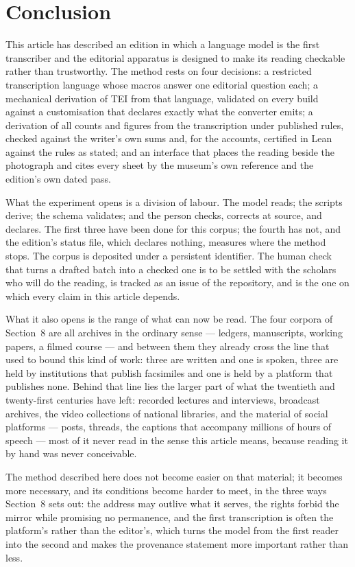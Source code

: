 \documentclass[11pt]{article}
\begin{document}
\section{Conclusion}

This article has described an edition in which a language model is the first transcriber and the editorial apparatus is designed to make its reading checkable rather than trustworthy. The method rests on four decisions: a restricted transcription language whose macros answer one editorial question each; a mechanical derivation of TEI from that language, validated on every build against a customisation that declares exactly what the converter emits; a derivation of all counts and figures from the transcription under published rules, checked against the writer's own sums and, for the accounts, certified in Lean against the rules as stated; and an interface that places the reading beside the photograph and cites every sheet by the museum's own reference and the edition's own dated pass.

What the experiment opens is a division of labour. The model reads; the scripts derive; the schema validates; and the person checks, corrects at source, and declares. The first three have been done for this corpus; the fourth has not, and the edition's status file, which declares nothing, measures where the method stops. The corpus is deposited under a persistent identifier. The human check that turns a drafted batch into a checked one is to be settled with the scholars who will do the reading, is tracked as an issue of the repository, and is the one on which every claim in this article depends.

What it also opens is the range of what can now be read. The four corpora of
Section~8 are all archives in the ordinary sense --- ledgers, manuscripts,
working papers, a filmed course --- and between them they already cross the
line that used to bound this kind of work: three are written and one is spoken,
three are held by institutions that publish facsimiles and one is held by a
platform that publishes none. Behind that line lies the larger part of what the
twentieth and twenty-first centuries have left: recorded lectures and
interviews, broadcast archives, the video collections of national libraries,
and the material of social platforms --- posts, threads, the captions that
accompany millions of hours of speech --- most of it never read in the sense
this article means, because reading it by hand was never conceivable.

The method described here does not become easier on that material; it becomes
more necessary, and its conditions become harder to meet, in the three ways
Section~8 sets out: the address may outlive what it serves, the rights forbid
the mirror while promising no permanence, and the first transcription is often
the platform's rather than the editor's, which turns the model from the first
reader into the second and makes the provenance statement more important rather
than less.
\end{document}
